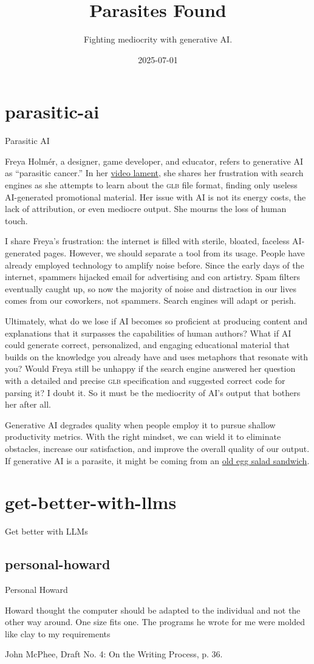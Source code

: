 \documentclass{article}
\title{Parasites Found}
\subtitle{Fighting mediocrity with generative AI.}
\date{2025-07-01}
\begin{document}
\section{parasitic-ai}{Parasitic AI}

Freya Holmér, a designer, game developer, and educator, refers to generative AI as ``parasitic cancer.''
In her \href{https://youtu.be/-opBifFfsMY?si=5SZIgOB76GTq0hBu}{video lament},
she shares her frustration with search engines as she attempts to learn about the \textsc{glb} file format,
finding only useless AI-generated promotional material.
Her issue with AI is not its energy costs, the lack of attribution, or even mediocre output.
She mourns the loss of human touch.

I share Freya’s frustration: the internet is filled with sterile, bloated, faceless AI-generated pages.
However, we should separate a tool from its usage.
People have already employed technology to amplify noise before.
Since the early days of the internet, spammers hijacked email for advertising and con artistry.
Spam filters eventually caught up, so now the majority of noise and distraction in our lives comes from our coworkers, not spammers.
Search engines will adapt or perish.

Ultimately, what do we lose if AI becomes so proficient at producing content and explanations that it surpasses the capabilities of human authors?
What if AI could generate correct, personalized, and engaging educational material that builds on the knowledge you already have and uses metaphors that resonate with you?
Would Freya still be unhappy if the search engine answered her question with a detailed and precise \textsc{glb} specification and suggested correct code for parsing it?
I doubt it.
So it must be the mediocrity of AI's output that bothers her after all.

Generative AI degrades quality when people employ it to pursue shallow productivity metrics.
With the right mindset, we can wield it to eliminate obstacles, increase our satisfaction, and improve the overall quality of our output.
If generative AI is a parasite, it might be coming from an \href{https://en.wikipedia.org/wiki/Parasites_Lost}{old egg salad sandwich}.

\section{get-better-with-llms}{Get better with LLMs}
\subsection{personal-howard}{Personal Howard}
\epigraph{
  Howard thought the computer should be adapted to the individual and not the other way around.
  One size fits one.
  The programs he wrote for me were molded like clay to my requirements
}{John McPhee, Draft No. 4: On the Writing Process, p. 36.}
\end{document}
